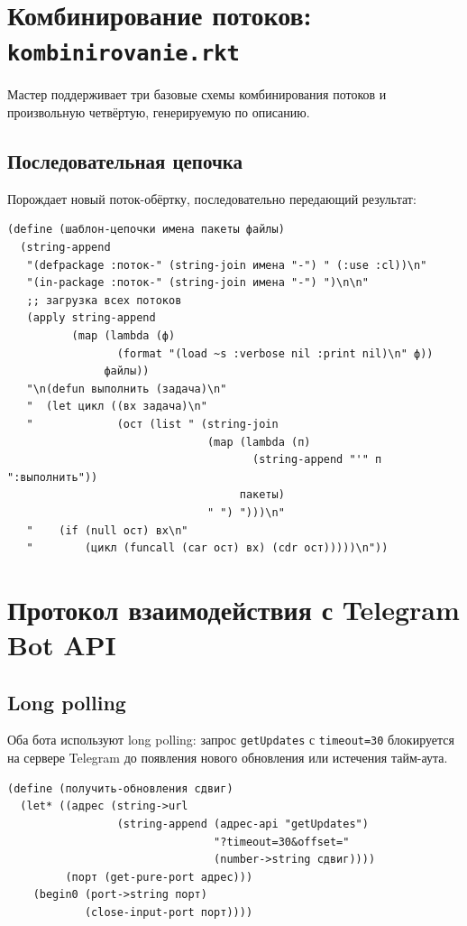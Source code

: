 \documentclass[11pt,a4paper]{article}
\begin{document}
\section{Комбинирование потоков: \texttt{kombinirovanie.rkt}}

Мастер поддерживает три базовые схемы комбинирования потоков и произвольную
четвёртую, генерируемую по описанию.

\subsection{Последовательная цепочка}

Порождает новый поток-обёртку, последовательно передающий результат:

\begin{lstlisting}[language=Racket, caption={Генерация кода цепочки потоков}]
(define (шаблон-цепочки имена пакеты файлы)
  (string-append
   "(defpackage :поток-" (string-join имена "-") " (:use :cl))\n"
   "(in-package :поток-" (string-join имена "-") ")\n\n"
   ;; загрузка всех потоков
   (apply string-append
          (map (lambda (ф)
                 (format "(load ~s :verbose nil :print nil)\n" ф))
               файлы))
   "\n(defun выполнить (задача)\n"
   "  (let цикл ((вх задача)\n"
   "             (ост (list " (string-join
                               (map (lambda (п)
                                      (string-append "'" п ":выполнить"))
                                    пакеты)
                               " ") ")))\n"
   "    (if (null ост) вх\n"
   "        (цикл (funcall (car ост) вх) (cdr ост)))))\n"))
\end{lstlisting}

\section{Протокол взаимодействия с Telegram Bot API}

\subsection{Long polling}

Оба бота используют long polling: запрос \texttt{getUpdates} с \texttt{timeout=30}
блокируется на сервере Telegram до появления нового обновления или истечения тайм-аута.

\begin{lstlisting}[language=Racket, caption={Long polling в Racket}]
(define (получить-обновления сдвиг)
  (let* ((адрес (string->url
                 (string-append (адрес-api "getUpdates")
                                "?timeout=30&offset="
                                (number->string сдвиг))))
         (порт (get-pure-port адрес)))
    (begin0 (port->string порт)
            (close-input-port порт))))
\end{lstlisting}
\end{document}
